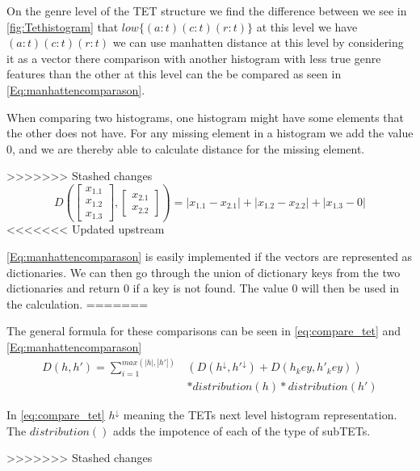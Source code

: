	On the genre level of the TET structure we find the difference between we see in \autoref{fig:Tethistogram} that $low\{(a:t)(c:t)(r:t)\}$ at this level we have $(a:t)(c:t)(r:t)$ we can use manhatten distance at this level by considering it as a vector there comparison with another histogram with less true genre features than the other at this level can the be compared as seen in \autoref{Eq:manhattencomparason}\cite{singh2013k}.
	
	
	
	When comparing two histograms, one histogram might have some elements that the other does not have. For any missing element in a histogram we add the value $0$, and we are thereby able to calculate distance for the missing element.
	
>>>>>>> Stashed changes
	\begin{equation}\label{Eq:manhattencomparason}
	D(\begin{bmatrix}
	x_{1.1} \\
	x_{1.2} \\
	x_{1.3}
	\end{bmatrix},
	\begin{bmatrix}
	x_{2.1} \\
	x_{2.2}
	\end{bmatrix})= |x_{1.1} - x_{2.1}| + |x_{1.2} - x_{2.2}| + |x_{1.3} - 0|
	\end{equation}
<<<<<<< Updated upstream

	\autoref{Eq:manhattencomparason} is easily implemented if the vectors are represented as dictionaries. We can then go through the union of dictionary keys from the two dictionaries and return $0$ if a key is not found. The value $0$ will then be used in the calculation.
=======
	
	The general formula for these comparisons can be seen in \autoref{eq:compare_tet} and \autoref{Eq:manhattencomparason}
	\begin{equation}\label{eq:compare_tet}
	\begin{split}
	D(h,h') = \sum_{i=1}^{max(|h|,|h'|)} & (D(h^{\downarrow}, h'^{\downarrow})+ D(h_key, h'_key))  \\
	& * distribution(h) * distribution (h')
	\end{split}
	\end{equation}
	
	In \autoref{eq:compare_tet} $h^{\downarrow}$ meaning the TETs next level histogram representation. The $distribution()$ adds the impotence of each of the type of subTETs.
	
	
>>>>>>> Stashed changes

